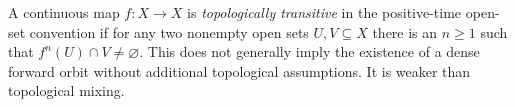 
A continuous map $f:X\to X$ is \emph{topologically transitive} in the positive-time open-set convention if for any two nonempty open sets $U,V\subseteq X$ there is an $n\ge1$ such that $f^n(U)\cap V\ne\varnothing$. This does not generally imply the existence of a dense forward orbit without additional topological assumptions. It is weaker than topological mixing.
